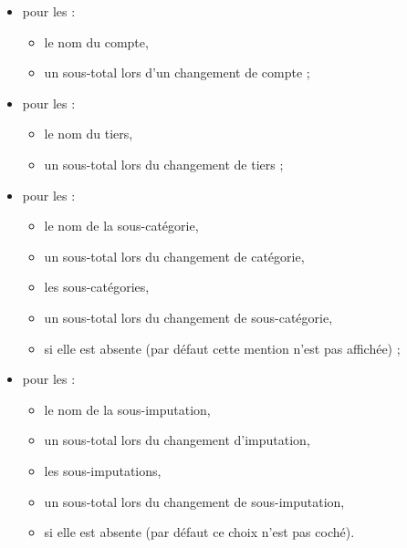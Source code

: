 \begin{itemize}
	\item pour les  :	
		\begin{itemize}
			\item le nom du compte,
			\item un sous-total lors d'un changement de compte ;
		\end{itemize} 	
	\item pour les  :	
		\begin{itemize}
			\item le nom du tiers,
			\item un sous-total lors du changement de tiers ;
		\end{itemize} 	
	\item pour les  :	
		\begin{itemize}
			\item le nom de la sous-catégorie,
			\item un sous-total lors du changement de catégorie,	
			\item les sous-catégories,
			\item un sous-total lors du changement de sous-catégorie,	
			\item {} si elle est absente (par défaut cette mention n'est pas affichée) ;
		\end{itemize} 	
	\item pour les  :	
		\begin{itemize}
			\item le nom de la sous-imputation,
			\item un sous-total lors du changement d'imputation,
			\item les sous-imputations,			
			\item un sous-total lors du changement de sous-imputation,
			\item {} si elle est absente (par défaut ce choix n'est pas coché).
		\end{itemize} 
\end{itemize} 


